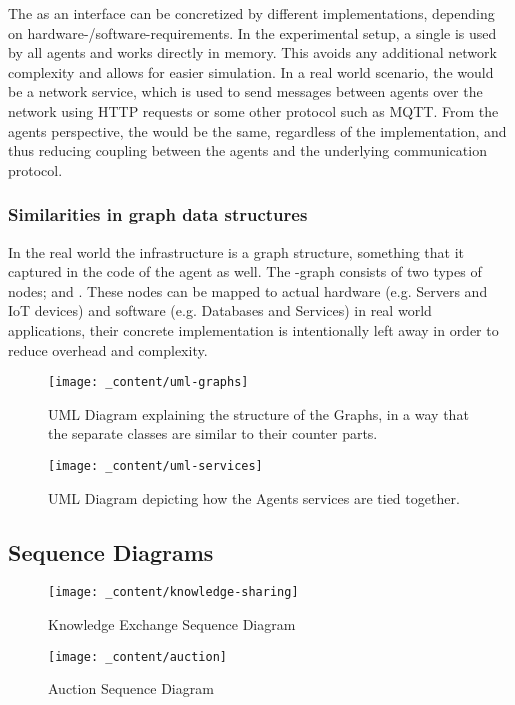 The  as an interface can be concretized by different implementations, depending on hardware-/software-requirements. In the experimental setup, a single  is used by all agents and works directly in memory. This avoids any additional network complexity and allows for easier simulation. In a real world scenario, the  would be a network service, which is used to send messages between agents over the network using HTTP requests or some other protocol such as MQTT. From the agents perspective, the  would be the same, regardless of the implementation, and thus reducing coupling between the agents and the underlying communication protocol.

\subsubsection{Similarities in graph data structures}
\label{sssec:graph-data-structures}
In the real world the infrastructure is a graph structure, something that it  captured in the code of the agent as well. The -graph consists of two types of nodes;  and . These nodes can be mapped to actual hardware (e.g. Servers and IoT devices) and software (e.g. Databases and Services) in real world applications, their concrete implementation is intentionally left away in order to reduce overhead and complexity.

\begin{figure}[H]
    \centering
    \texttt{[image: \_content/uml-graphs]}
    \caption{UML Diagram explaining the structure of the Graphs, in a way that the separate classes are similar to their counter parts.}
    \label{fig:uml-graphs}
\end{figure}


\begin{figure}[H]
    \centering
    \texttt{[image: \_content/uml-services]}
    \caption{UML Diagram depicting how the Agents services are tied together.}
    \label{fig:uml-services}
\end{figure}

\subsection{Sequence Diagrams}
\label{ssec:sequence-diagrams}
\begin{figure}[H]
    \centering
    \texttt{[image: \_content/knowledge-sharing]}
    \caption{Knowledge Exchange Sequence Diagram}
    \label{fig:knowledge-sharing}
\end{figure}

\begin{figure}[H]
    \centering
    \texttt{[image: \_content/auction]}
    \caption{Auction Sequence Diagram}
    \label{fig:auction}
\end{figure}

